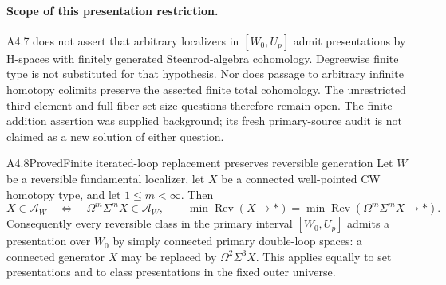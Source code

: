 \paragraph{Scope of this presentation restriction.}
A4.7 does not assert that arbitrary localizers in $[W_0,U_p]$
admit presentations by H-spaces with finitely generated
Steenrod-algebra cohomology.  Degreewise finite type is not
substituted for that hypothesis.  Nor does passage to arbitrary
infinite homotopy colimits preserve the asserted finite total
cohomology.  The unrestricted third-element and full-fiber
set-size questions therefore remain open.  The finite-addition
assertion was supplied background; its fresh primary-source
audit is not claimed as a new solution of either question.

\begin{claim}{A4.8}{Proved}{Finite iterated-loop replacement preserves reversible generation}
\label{A48}
Let $W$ be a reversible fundamental localizer, let $X$ be a
connected well-pointed CW homotopy type, and let $1\leq m<\infty$.
Then
\[
 X\in\mathcal A_W
 \quad\Longleftrightarrow\quad
 \Omega^m\Sigma^mX\in\mathcal A_W,
 \qquad
 \min\operatorname{Rev}(X\to*)
   =\min\operatorname{Rev}(\Omega^m\Sigma^mX\to*).
 \tag{A4.8.1}
\]
Consequently every reversible class in the primary interval
$[W_0,U_p]$ admits a presentation over $W_0$ by simply connected
primary double-loop spaces: a connected generator $X$ may be
replaced by $\Omega^2\Sigma^3X$.  This applies equally to set
presentations and to class presentations in the fixed outer universe.
\end{claim}

